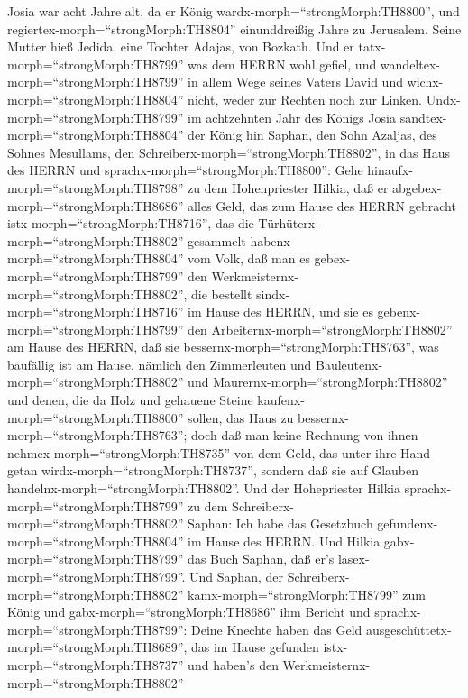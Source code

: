  Josia war acht Jahre alt, da er König
wardx-morph=``strongMorph:TH8800'', und
regiertex-morph=``strongMorph:TH8804'' einunddreißig Jahre zu Jerusalem.
Seine Mutter hieß Jedida, eine Tochter Adajas, von Bozkath. 
Und er tatx-morph=``strongMorph:TH8799'' was dem HERRN wohl gefiel, und
wandeltex-morph=``strongMorph:TH8799'' in allem Wege seines Vaters David
und wichx-morph=``strongMorph:TH8804'' nicht, weder zur Rechten noch zur
Linken.  Undx-morph=``strongMorph:TH8799'' im achtzehnten
Jahr des Königs Josia sandtex-morph=``strongMorph:TH8804'' der König hin
Saphan, den Sohn Azaljas, des Sohnes Mesullams, den
Schreiberx-morph=``strongMorph:TH8802'', in das Haus des HERRN und
sprachx-morph=``strongMorph:TH8800'':  Gehe
hinaufx-morph=``strongMorph:TH8798'' zu dem Hohenpriester Hilkia, daß er
abgebex-morph=``strongMorph:TH8686'' alles Geld, das zum Hause des HERRN
gebracht istx-morph=``strongMorph:TH8716'', das die
Türhüterx-morph=``strongMorph:TH8802'' gesammelt
habenx-morph=``strongMorph:TH8804'' vom Volk,  daß man es
gebex-morph=``strongMorph:TH8799'' den
Werkmeisternx-morph=``strongMorph:TH8802'', die bestellt
sindx-morph=``strongMorph:TH8716'' im Hause des HERRN, und sie es
gebenx-morph=``strongMorph:TH8799'' den
Arbeiternx-morph=``strongMorph:TH8802'' am Hause des HERRN, daß sie
bessernx-morph=``strongMorph:TH8763'', was baufällig ist am Hause,
 nämlich den Zimmerleuten und
Bauleutenx-morph=``strongMorph:TH8802'' und
Maurernx-morph=``strongMorph:TH8802'' und denen, die da Holz und
gehauene Steine kaufenx-morph=``strongMorph:TH8800'' sollen, das Haus zu
bessernx-morph=``strongMorph:TH8763'';  doch daß man keine
Rechnung von ihnen nehmex-morph=``strongMorph:TH8735'' von dem Geld, das
unter ihre Hand getan wirdx-morph=``strongMorph:TH8737'', sondern daß
sie auf Glauben handelnx-morph=``strongMorph:TH8802''.  Und
der Hohepriester Hilkia sprachx-morph=``strongMorph:TH8799'' zu dem
Schreiberx-morph=``strongMorph:TH8802'' Saphan: Ich habe das Gesetzbuch
gefundenx-morph=``strongMorph:TH8804'' im Hause des HERRN. Und Hilkia
gabx-morph=``strongMorph:TH8799'' das Buch Saphan, daß er's
läsex-morph=``strongMorph:TH8799''.  Und Saphan, der
Schreiberx-morph=``strongMorph:TH8802''
kamx-morph=``strongMorph:TH8799'' zum König und
gabx-morph=``strongMorph:TH8686'' ihm Bericht und
sprachx-morph=``strongMorph:TH8799'': Deine Knechte haben das Geld
ausgeschüttetx-morph=``strongMorph:TH8689'', das im Hause gefunden
istx-morph=``strongMorph:TH8737'' und haben's den
Werkmeisternx-morph=``strongMorph:TH8802''
